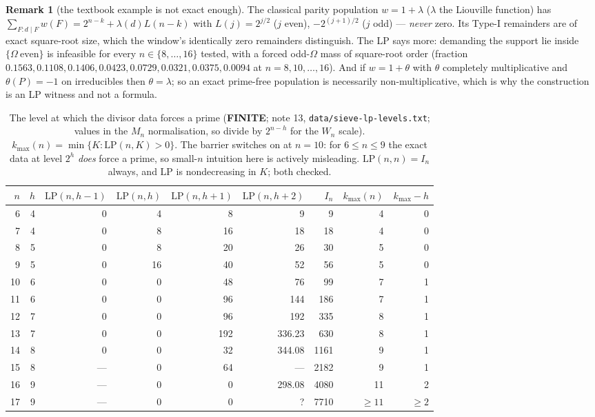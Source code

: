 \documentclass[10pt]{article}
\theoremstyle{plain}
\theoremstyle{definition}
\newtheorem{remark}[theorem]{Remark}
\newcommand{\finite}{\textcolor{finite}{\textsf{\textbf{\footnotesize FINITE}}}}
\begin{document}
\begin{remark}[the textbook example is not exact enough]
The classical parity population $w=1+\lambda$ ($\lambda$ the Liouville
function) has $\sum_{F:d\mid F}w(F)=2^{n-k}+\lambda(d)L(n-k)$ with
$L(j)=2^{j/2}$ ($j$ even), $-2^{(j+1)/2}$ ($j$ odd) --- \emph{never} zero. Its
Type-I remainders are of exact square-root size, which the window's identically
zero remainders distinguish. The LP says more: demanding the support lie inside
$\{\Omega\ \mathrm{even}\}$ is infeasible for every $n\in\{8,\dots,16\}$
tested, with a forced odd-$\Omega$ mass of square-root order (fraction
$0.1563,0.1108,0.1406,0.0423,0.0729,0.0321,0.0375,0.0094$ at
$n=8,10,\dots,16$). And if $w=1+\theta$ with $\theta$ completely multiplicative
and $\theta(P)=-1$ on irreducibles then $\theta=\lambda$; so an exact prime-free
population is necessarily non-multiplicative, which is why the construction is
an LP witness and not a formula.
\end{remark}

\begin{table}[t]
\centering\small
\begin{tabular}{rrrrrrrrr}
\hline
$n$ & $h$ & $\mathrm{LP}(n,h{-}1)$ & $\mathrm{LP}(n,h)$ & $\mathrm{LP}(n,h{+}1)$
 & $\mathrm{LP}(n,h{+}2)$ & $I_n$ & $k_{\max}(n)$ & $k_{\max}-h$\\
\hline
 6 & 4 & 0 & 4 & 8 & 9 & 9 & 4 & 0\\
 7 & 4 & 0 & 8 & 16 & 18 & 18 & 4 & 0\\
 8 & 5 & 0 & 8 & 20 & 26 & 30 & 5 & 0\\
 9 & 5 & 0 & 16 & 40 & 52 & 56 & 5 & 0\\
10 & 6 & 0 & 0 & 48 & 76 & 99 & 7 & 1\\
11 & 6 & 0 & 0 & 96 & 144 & 186 & 7 & 1\\
12 & 7 & 0 & 0 & 96 & 192 & 335 & 8 & 1\\
13 & 7 & 0 & 0 & 192 & 336.23 & 630 & 8 & 1\\
14 & 8 & 0 & 0 & 32 & 344.08 & 1161 & 9 & 1\\
15 & 8 & --- & 0 & 64 & --- & 2182 & 9 & 1\\
16 & 9 & --- & 0 & 0 & 298.08 & 4080 & 11 & 2\\
17 & 9 & --- & 0 & 0 & ? & 7710 & $\ge11$ & $\ge2$\\
\hline
\end{tabular}
\caption{The level at which the divisor data forces a prime (\finite; note 13,
\texttt{data/sieve-lp-levels.txt}; values in the $M_n$ normalisation, so divide
by $2^{n-h}$ for the $W_n$ scale). $k_{\max}(n)=\min\{K:\mathrm{LP}(n,K)>0\}$.
The barrier switches on at $n=10$: for $6\le n\le9$ the exact data at level
$2^h$ \emph{does} force a prime, so small-$n$ intuition here is actively
misleading. $\mathrm{LP}(n,n)=I_n$ always, and $\mathrm{LP}$ is nondecreasing
in $K$; both checked.}
\label{tab:kmax}
\end{table}
\end{document}
